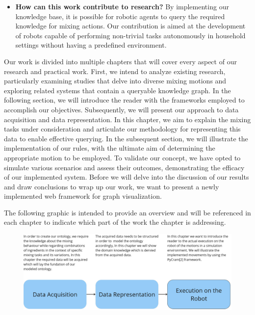\begin{itemize}
    \item \textbf{How can this work contribute to research?} By implementing our knowledge base, it is possible for robotic agents to query the required knowledge for mixing actions. Our contribution is aimed at the development of robots capable of performing non-trivial tasks autonomously in household settings without having a predefined environment.
\end{itemize}


Our work is divided into multiple chapters that will cover every aspect of our research and practical work.
First, we intend to analyze existing research, particularly examining studies that delve into diverse mixing motions and exploring related systems that contain a queryable knowledge graph.
In the following section, we will introduce the reader with the frameworks employed to accomplish our objectives.	
Subsequently, we will present our approach to data acquisition and data representation.
In this chapter, we aim to explain the mixing tasks under consideration and articulate our methodology for representing this data to enable effective querying.
In the subsequent section, we will illustrate the implementation of our rules, with the ultimate aim of determining the appropriate motion to be employed.
To validate our concept, we have opted to simulate various scenarios and assess their outcomes, demonstrating the efficacy of our implemented system.
Before we will delve into the discussion of our results and draw conclusions to wrap up our work, we want to present a newly implemented web framework for graph visualization.

The following graphic is intended to provide an overview and will be referenced in each chapter to indicate which part of the work the chapter is addressing.
\begin{figure}[H]
    \includegraphics[scale=0.25]{Graphics/structure_overview.jpg}
\end{figure}